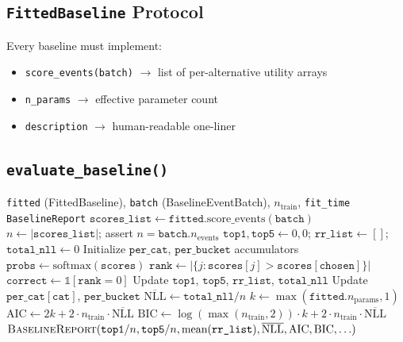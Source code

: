 \documentclass[11pt,a4paper]{article}
\begin{document}
\subsection{\texttt{FittedBaseline} Protocol}

Every baseline must implement:
\begin{itemize}
\item \texttt{score\_events(batch)} $\to$ list of per-alternative utility arrays
\item \texttt{n\_params} $\to$ effective parameter count
\item \texttt{description} $\to$ human-readable one-liner
\end{itemize}

\subsection{\texttt{evaluate\_baseline()}}

\begin{algorithm}[H]
\caption{\textsc{EvaluateBaseline}}\label{alg:eval-baseline}
\begin{algorithmic}[1]
\Require \texttt{fitted} (FittedBaseline), \texttt{batch} (BaselineEventBatch), $n_{\text{train}}$, \texttt{fit\_time}
\Ensure \texttt{BaselineReport}
\State $\texttt{scores\_list} \gets \texttt{fitted}.\text{score\_events}(\texttt{batch})$
\State $n \gets |\texttt{scores\_list}|$; assert $n = \texttt{batch}.n_{\text{events}}$
\State $\texttt{top1}, \texttt{top5} \gets 0, 0$; \; $\texttt{rr\_list} \gets []$; \; $\texttt{total\_nll} \gets 0$
\State Initialize $\texttt{per\_cat}$, $\texttt{per\_bucket}$ accumulators
    \State $\texttt{probs} \gets \text{softmax}(\texttt{scores})$
    \State $\texttt{rank} \gets |\{j : \texttt{scores}[j] > \texttt{scores}[\texttt{chosen}]\}|$
    \State $\texttt{correct} \gets \mathbb{1}[\texttt{rank} = 0]$
    \State Update $\texttt{top1}$, $\texttt{top5}$, $\texttt{rr\_list}$, $\texttt{total\_nll}$
    \State Update $\texttt{per\_cat}[\texttt{cat}]$, $\texttt{per\_bucket}$
\EndFor
\State $\overline{\text{NLL}} \gets \texttt{total\_nll} / n$
\State $k \gets \max(\texttt{fitted}.n_{\text{params}}, 1)$
\State $\text{AIC} \gets 2k + 2 \cdot n_{\text{train}} \cdot \overline{\text{NLL}}$
\State $\text{BIC} \gets \log(\max(n_{\text{train}}, 2)) \cdot k + 2 \cdot n_{\text{train}} \cdot \overline{\text{NLL}}$
\State \Return $\Call{BaselineReport}{\texttt{top1}/n, \texttt{top5}/n, \text{mean}(\texttt{rr\_list}), \overline{\text{NLL}}, \text{AIC}, \text{BIC}, \ldots}$
\end{algorithmic}
\end{algorithm}
\end{document}
